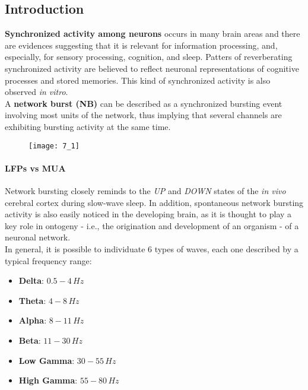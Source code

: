 \subsection{Introduction}
\textbf{Synchronized activity among neurons} occurs in many brain areas and there
are evidences suggesting that it is relevant for information processing, and,
especially, for sensory processing, cognition, and sleep. Patters of reverberating
synchronized activity are believed to reflect neuronal representations of cognitive
processes and stored memories. This kind of synchronized activity is also observed
\textit{in vitro}.\\
A \textbf{network burst (NB)} can be described as a synchronized bursting event
involving most units of the network, thus implying that several channels are
exhibiting bursting activity at the same time.
\begin{figure}[H]
    \texttt{[image: 7\_1]}
    \centering
\end{figure}
\paragraph{LFPs vs MUA}
Network bursting closely reminds to the \textit{UP} and \textit{DOWN} states
of the \textit{in vivo} cerebral cortex during slow-wave sleep.
In addition, spontaneous network bursting activity is also easily
noticed in the developing brain, as it is thought to play a key role in ontogeny
- i.e., the origination and development of an organism - of a neuronal network.\\
In general, it is possible to individuate 6 types of waves, each one described by a
typical frequency range:
\begin{itemize}
    \item \textbf{Delta}: \(0.5-4\,Hz\)
    \item \textbf{Theta}: \(4-8\,Hz\)
    \item \textbf{Alpha}: \(8-11\,Hz\)
    \item \textbf{Beta}: \(11-30\,Hz\)
    \item \textbf{Low Gamma}: \(30-55\,Hz\)
    \item \textbf{High Gamma}: \(55-80\,Hz\)
\end{itemize}

